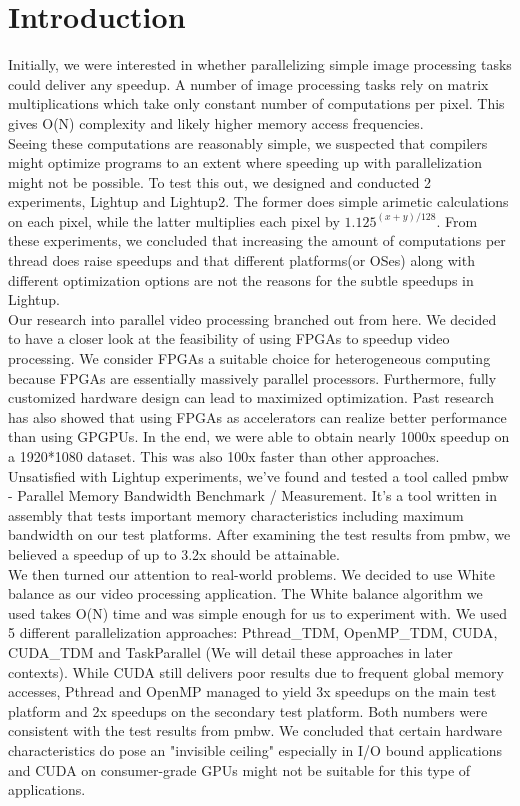 \documentclass{acm_proc_article-sp}
\begin{document}
\section{Introduction}
Initially, we were interested in whether parallelizing simple image processing tasks could deliver any speedup. A number of image processing tasks rely on matrix multiplications which take only constant number of computations per pixel. This gives O(N) complexity and likely higher memory access frequencies. \\
Seeing these computations are reasonably simple, we suspected that compilers might optimize programs to an extent where speeding up with parallelization might not be possible. To test this out, we designed and conducted 2 experiments, Lightup and Lightup2. The former does simple arimetic calculations on each pixel, while the latter multiplies each pixel by \(1.125^{(x+y)/128}\). From these experiments, we concluded that increasing the amount of computations per thread does raise speedups and that different platforms(or OSes) along with different optimization options are not the reasons for the subtle speedups in Lightup. \\
Our research into parallel video processing branched out from here. We decided to have a closer look at the feasibility of using FPGAs to speedup video processing. We consider FPGAs a suitable choice for heterogeneous computing because FPGAs are essentially massively parallel processors. Furthermore, fully customized hardware design can lead to maximized optimization. Past research has also showed that using FPGAs as accelerators can realize better performance than using GPGPUs. In the end, we were able to obtain nearly 1000x speedup on a 1920*1080 dataset. This was also 100x faster than other approaches. \\
Unsatisfied with Lightup experiments, we've found and tested a tool called pmbw - Parallel Memory Bandwidth Benchmark / Measurement. It's a tool written in assembly that tests important memory characteristics including maximum bandwidth on our test platforms. After examining the test results from pmbw, we believed a speedup of up to 3.2x should be attainable. \\
We then turned our attention to real-world problems. We decided to use White balance as our video processing application. The White balance algorithm we used takes O(N) time and was simple enough for us to experiment with. We used 5 different parallelization approaches: Pthread\_TDM, OpenMP\_TDM, CUDA, CUDA\_TDM and TaskParallel (We will detail these approaches in later contexts). While CUDA still delivers poor results due to frequent global memory accesses, Pthread and OpenMP managed to yield 3x speedups on the main test platform and 2x speedups on the secondary test platform. Both numbers were consistent with the test results from pmbw. We concluded that certain hardware characteristics do pose an "invisible ceiling" especially in I/O bound applications and CUDA on consumer-grade GPUs might not be suitable for this type of applications.
\end{document}

